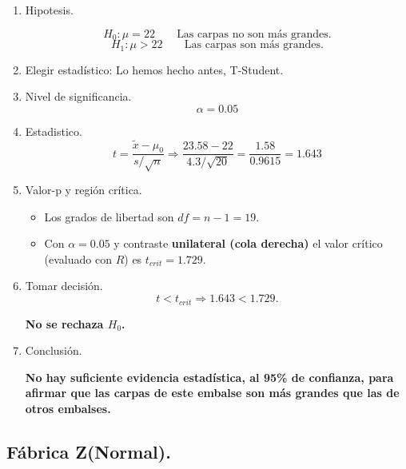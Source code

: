 \documentclass[a4paper,12pt]{article} %
\begin{document}
\begin{enumerate}
    \item Hipotesis.
    
    \[H_0: \mu = 22 \;\;\;\;\;\;\; \text{Las carpas no son más grandes.}\]
    \[H_1: \mu > 22 \;\;\;\;\;\;\; \text{Las carpas son más grandes.}\]

    \item Elegir estadístico: Lo hemos hecho antes, T-Student.

    \item Nivel de significancia.
    \[ \alpha = 0.05\]

    \item Estadistico.
    \[t = \frac{\tilde{x} - \mu_0}{s/\sqrt{n}} \Rightarrow \frac{23.58 - 22}{4.3/\sqrt{20}} = \frac{1.58}{0.9615} = 1.643\]

    \item Valor-p y región crítica.
    \begin{itemize}
        \item Los grados de libertad son \(df = n -1 = 19.\)
        \item Con \(\alpha = 0.05\) y contraste \textbf{unilateral (cola derecha)} el valor crítico (evaluado con \(R\)) es \(t_{crit}= 1.729\).
    \end{itemize}

    \item Tomar decisión.
    \[t < t_{crit} \Rightarrow 1.643 < 1.729.\]

    \textbf{No se rechaza \(H_0\).}

    \item Conclusión.
    \begin{justify}
        \textbf{No hay suficiente evidencia estadística, al 95\% de confianza, para afirmar que las carpas de este embalse son más grandes que las de otros embalses.}
    \end{justify}
\end{enumerate}

\subsection{Fábrica Z(Normal).}
\end{document}
